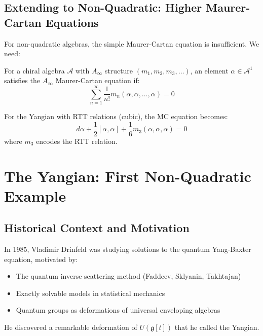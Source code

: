 \subsection{Extending to Non-Quadratic: Higher Maurer-Cartan Equations}

For non-quadratic algebras, the simple Maurer-Cartan equation is insufficient. We need:

\begin{definition}
For a chiral algebra $\mathcal{A}$ with $A_\infty$ structure $(m_1, m_2, m_3, \ldots)$, an element $\alpha \in \mathcal{A}^1$ satisfies the $A_\infty$ Maurer-Cartan equation if:
\[
\sum_{n=1}^{\infty} \frac{1}{n!} m_n(\alpha, \alpha, \ldots, \alpha) = 0
\]
\end{definition}

\begin{example}
For the Yangian with RTT relations (cubic), the MC equation becomes:
\[
d\alpha + \frac{1}{2}[\alpha, \alpha] + \frac{1}{6}m_3(\alpha, \alpha, \alpha) = 0
\]
where $m_3$ encodes the RTT relation.
\end{example}


\section{The Yangian: First Non-Quadratic Example}

\subsection{Historical Context and Motivation}

In 1985, Vladimir Drinfeld was studying solutions to the quantum Yang-Baxter equation, motivated by:
\begin{itemize}
\item The quantum inverse scattering method (Faddeev, Sklyanin, Takhtajan)
\item Exactly solvable models in statistical mechanics
\item Quantum groups as deformations of universal enveloping algebras
\end{itemize}

He discovered a remarkable deformation of $U(\mathfrak{g}[t])$ that he called the Yangian.

